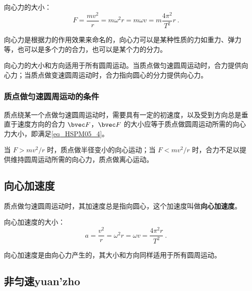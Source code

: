 向心力的大小：
\begin{equation}\label{eq_HSPM05_4}
F=\frac{mv^2}{r}=m\omega^2r=m\omega v=m\frac{4\pi^2}{T^2}r~.
\end{equation}

向心力是根据力的作用效果来命名的，向心力可以是某种性质的力如重力、弹力等，也可以是多个力的合力，也可以是某个力的分力。

向心力的大小和方向适用于所有圆周运动。当质点做匀速圆周运动时，合力提供向心力；当质点做变速圆周运动时，合力指向圆心的分力提供向心力。

\subsubsection{质点做匀速圆周运动的条件}

质点绕某一个点做匀速圆周运动时，需要具有一定的初速度，以及受到方向总是垂直于速度方向的合力 $\bvec F$，$\bvec F$ 的大小应等于质点做圆周运动所需的向心力大小，即满足\autoref{eq_HSPM05_4}。

当 $F>mv^2/r$ 时，质点做半径变小的向心运动；当 $F<mv^2/r$ 时，合力不足以提供维持圆周运动所需的向心力，质点做离心运动。

\subsection{向心加速度}

质点做匀速圆周运动时，其加速度总是指向圆心，这个加速度叫做\textbf{向心加速度}。

向心加速度的大小：
\begin{equation}
a=\frac{v^2}{r}=\omega^2r=\omega v=\frac{4\pi^2r}{T^2}~.
\end{equation}

向心加速度是由向心力产生的，其大小和方向同样适用于所有圆周运动。

\subsection{非匀速yuan'zho}
